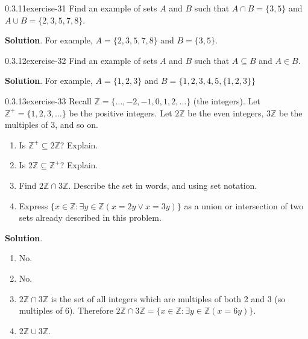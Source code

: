 \documentclass[twoside,11pt,]{book}
\numberwithin{equation}{chapter}
\newcommand{\Z}{\mathbb Z}
\newcommand{\st}{:}
\begin{document}
\begin{divisionsolution}{0.3.11}{}{exercise-31}%
\hypertarget{p-679}{}%
Find an example of sets \(A\) and \(B\) such that \(A\cap B = \{3, 5\}\) and \(A \cup B = \{2, 3, 5, 7, 8\}\).%
\par\smallskip%
\noindent\textbf{Solution}.\quad%
\hypertarget{p-680}{}%
For example, \(A = \{2,3,5,7,8\}\) and \(B = \{3,5\}\).%
\end{divisionsolution}%
\begin{divisionsolution}{0.3.12}{}{exercise-32}%
\hypertarget{p-681}{}%
Find an example of sets \(A\) and \(B\) such that \(A \subseteq B\) and \(A \in B\).%
\par\smallskip%
\noindent\textbf{Solution}.\quad%
\hypertarget{p-682}{}%
For example, \(A = \{1,2,3\}\) and \(B = \{1,2,3,4,5,\{1,2,3\}\}\)%
\end{divisionsolution}%
\begin{divisionsolution}{0.3.13}{}{exercise-33}%
\hypertarget{p-683}{}%
Recall \(\Z = \{\ldots,-2,-1,0, 1,2,\ldots\}\) (the integers). Let \(\Z^+ = \{1, 2, 3, \ldots\}\) be the positive integers. Let \(2\Z\) be the even integers, \(3\Z\) be the multiples of 3, and so on.\leavevmode%
\begin{enumerate}[label=(\alph*)]
\item\hypertarget{li-628}{}\hypertarget{p-684}{}%
Is \(\Z^+ \subseteq 2\Z\)? Explain.%
\item\hypertarget{li-629}{}\hypertarget{p-685}{}%
Is \(2\Z \subseteq \Z^+\)? Explain.%
\item\hypertarget{li-630}{}\hypertarget{p-686}{}%
Find \(2\Z \cap 3\Z\). Describe the set in words, and using set notation.%
\item\hypertarget{li-631}{}\hypertarget{p-687}{}%
Express \(\{x \in \Z \st \exists y\in \Z (x = 2y \vee x = 3y)\}\) as a union or intersection of two sets already described in this problem.%
\end{enumerate}
%
\par\smallskip%
\noindent\textbf{Solution}.\quad%
\hypertarget{p-688}{}%
\leavevmode%
\begin{enumerate}[label=(\alph*)]
\item\hypertarget{li-632}{}\hypertarget{p-689}{}%
No.%
\item\hypertarget{li-633}{}\hypertarget{p-690}{}%
No.%
\item\hypertarget{li-634}{}\(2\Z \cap 3\Z\) is the set of all integers which are multiples of both 2 and 3 (so multiples of 6). Therefore \(2\Z \cap 3\Z = \{x \in \Z \st \exists y\in \Z(x = 6y)\}\).%
\item\hypertarget{li-635}{}\(2\Z \cup 3\Z\).%
\end{enumerate}
%
\end{divisionsolution}%
\end{document}
